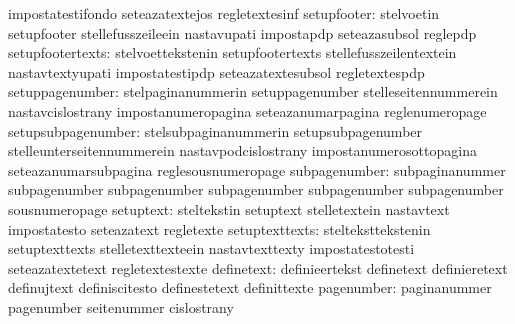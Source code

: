                                   impostatestifondo                seteazatextejos
                                  regletextesinf
                     setupfooter: stelvoetin                       setupfooter
                                  stellefusszeileein               nastavupati
                                  impostapdp                       seteazasubsol
                                  reglepdp
                setupfootertexts: stelvoettekstenin                setupfootertexts
                                  stellefusszeilentextein          nastavtextyupati
                                  impostatestipdp                  seteazatextesubsol
                                  regletextespdp
                 setuppagenumber: stelpaginanummerin               setuppagenumber
                                  stelleseitennummerein            nastavcislostrany
                                  impostanumeropagina              seteazanumarpagina
                                  reglenumeropage
              setupsubpagenumber: stelsubpaginanummerin            setupsubpagenumber
                                  stelleunterseitennummerein       nastavpodcislostrany
                                  impostanumerosottopagina         seteazanumarsubpagina
                                  reglesousnumeropage
                   subpagenumber: subpaginanummer                  subpagenumber
                                  subpagenumber                    subpagenumber
                                  subpagenumber                    subpagenumber
                                  sousnumeropage
                       setuptext: steltekstin                      setuptext
                                  stelletextein                    nastavtext
                                  impostatesto                     seteazatext
                                  regletexte
                  setuptexttexts: stelteksttekstenin               setuptexttexts
                                  stelletexttexteein               nastavtexttexty
                                  impostatestotesti                seteazatextetext
                                  regletextestexte
                      definetext: definieertekst                   definetext
                                  definieretext                    definujtext
                                  definiscitesto                   definestetext
                                  definittexte
                      pagenumber: paginanummer                     pagenumber
                                  seitenummer                      cislostrany
